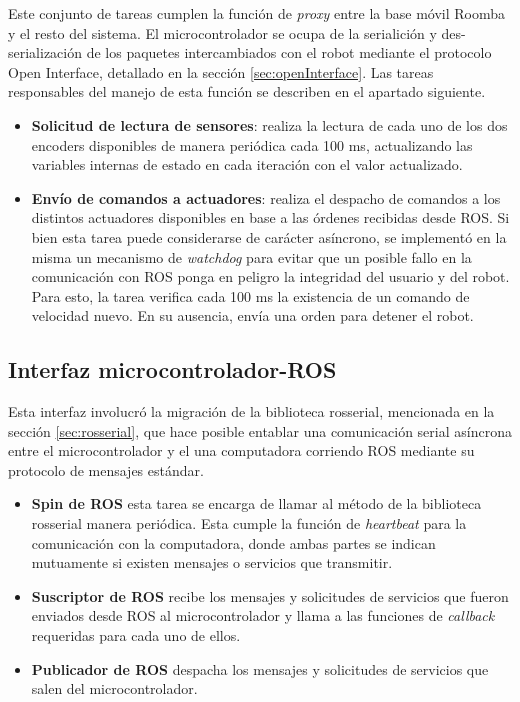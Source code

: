 Este conjunto de tareas cumplen la función de \textit{proxy} entre la base móvil Roomba y el resto del sistema. El microcontrolador se ocupa de la serialición y des-serialización de los paquetes intercambiados con el robot mediante el protocolo Open Interface, detallado en la sección \ref{sec:openInterface}. Las tareas responsables del manejo de esta función se describen en el apartado siguiente.

\begin{itemize}
  \item \textbf{Solicitud de lectura de sensores}: realiza la lectura de cada uno de los dos encoders disponibles de manera periódica cada 100 ms, actualizando las variables internas de estado en cada iteración con el valor actualizado.
  \item \textbf{Envío de comandos a actuadores}: realiza el despacho de comandos a los distintos actuadores disponibles en base a las órdenes recibidas desde ROS. Si bien esta tarea puede considerarse de carácter asíncrono, se implementó en la misma un mecanismo de \textit{watchdog} para evitar que un posible fallo en la comunicación con ROS ponga en peligro la integridad del usuario y del robot. Para esto, la tarea verifica cada 100 ms la existencia de un comando de velocidad nuevo. En su ausencia, envía una orden para detener el robot.
\end{itemize}

\subsection{Interfaz microcontrolador-ROS}

Esta interfaz involucró la migración de la biblioteca rosserial, mencionada en la sección \ref{sec:rosserial}, que hace posible entablar una comunicación serial asíncrona entre el microcontrolador y el una computadora corriendo ROS mediante su protocolo de mensajes estándar.

\begin{itemize}
  \item \textbf{Spin de ROS} esta tarea se encarga de llamar al método  de la biblioteca rosserial manera periódica. Esta cumple la función de \textit{heartbeat} para la comunicación con la computadora, donde ambas partes se indican mutuamente si existen mensajes o servicios que transmitir.
  \item \textbf{Suscriptor de ROS} recibe los mensajes y solicitudes de servicios que fueron enviados desde ROS al microcontrolador y llama a las funciones de \textit{callback} requeridas para cada uno de ellos.
  \item \textbf{Publicador de ROS} despacha los mensajes y solicitudes de servicios que salen del microcontrolador.
\end{itemize}

